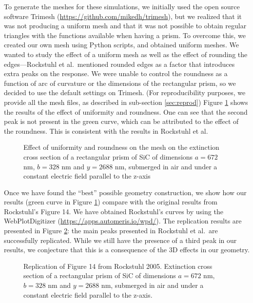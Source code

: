 To generate the meshes for these simulations, we initially used the open source software Trimesh 
(\url{https://github.com/mikedh/trimesh}), but we realized that it was not producing a 
uniform mesh and that it was not possible to obtain regular triangles with the functions 
available when having a prism. To overcome this, we created our own mesh using Python scripts,
and obtained uniform meshes. We wanted to study the effect of a uniform mesh as well as the effect
of rounding the edges---Rockstuhl et al.\ mentioned rounded edges
as a factor that introduces extra peaks on the response. We were unable to control the 
roundness as a function of arc of curvature or the dimensions of the rectangular prism, so we 
decided to use the default settings on Trimesh. 
(For reproducibility purposes, we provide all the mesh files, as described in sub-section \ref{sec:reprod})
Figure \ref{fig:tri_reg_round_14} shows the 
results of the effect of uniformity and roundness. One can see that the second peak is not
present in the green curve, which can be attributed to the effect of the roundness. This is 
consistent with the results in Rockstuhl et al. 

\begin{figure}
    \centering
    \caption{ Effect of uniformity and roundness on the mesh on the 
    extinction cross section of a rectangular prism of SiC of dimensions $a=672$ nm, 
    $b=328$ nm and $y=2688$ nm, submerged in air and under a constant electric field 
    parallel to the z-axis}
    \label{fig:tri_reg_round_14}
 \end{figure}

Once we have found the ``best'' possible geometry construction, we show how our results 
(green curve in Figure \ref{fig:tri_reg_round_14}) compare 
with the original results from Rockstuhl's Figure 14. We have obtained Rockstuhl's curves by using 
the WebPlotDigitizer (\url{https://apps.automeris.io/wpd/}). The replication results are 
presented in Figure \ref{fig:rep_14}: the main peaks presented in Rockstuhl et al.\ are 
successfully replicated. While we still have the presence of a third peak in our results, we conjecture 
that this is a consequence of the 3D effects in our geometry.

 \begin{figure}
    \centering
    \caption{Replication of Figure 14 from Rockstuhl 2005. Extinction cross section of a
    rectangular prism of SiC of dimensions $a=672$ nm, $b=328$ nm and $y=2688$ nm, submerged
    in air and under a constant electric field parallel to the z-axis.}
    \label{fig:rep_14}
 \end{figure}


